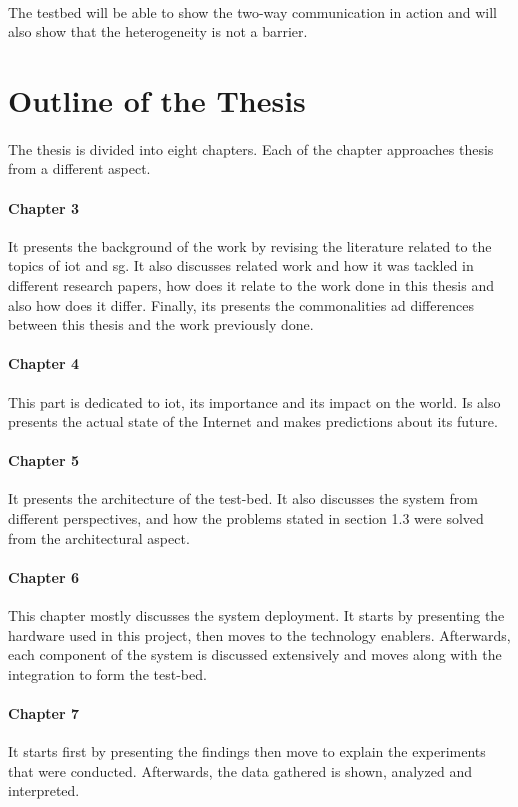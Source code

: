\documentclass[12pt,a4paper,final]{report}
\begin{document}
\paragraph{}
The testbed will be able to show the two-way communication in action and will also show that the heterogeneity is not a barrier.

\section{Outline of the Thesis}
\paragraph{}
The thesis is divided into eight chapters. Each of the chapter approaches thesis from a different aspect. 
\paragraph{Chapter 3}
It presents the background of the work by revising the literature related to the topics of \gls{iot} and \gls{sg}. It also discusses related work and how it was tackled in different research papers, how does it relate to the work done in this thesis and also how does it differ. Finally, its presents the commonalities ad differences between this thesis and the work previously done.
\paragraph{Chapter 4}
This part is dedicated to \gls{iot}, its importance and its impact on the world. Is also presents the actual state of the Internet and makes predictions about its future.
\paragraph{Chapter 5}
It presents the architecture of the test-bed. It also discusses the system from different perspectives, and how the problems stated in section 1.3 were solved from the architectural aspect.
\paragraph{Chapter 6}
This chapter mostly discusses the system deployment. It starts by presenting the hardware used in this project, then moves to the technology enablers. Afterwards, each component of the system is discussed extensively and moves along with the integration to form the test-bed.
\paragraph{Chapter 7}
It starts first by presenting the findings then move to explain the experiments that were conducted. Afterwards, the data gathered is shown, analyzed and interpreted.
\end{document}
